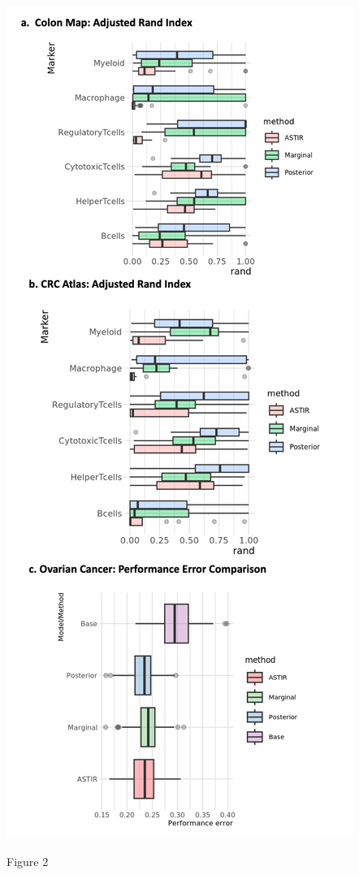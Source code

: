 \documentclass[
  letterpaper,
  DIV=11,
  numbers=noendperiod,
  oneside]{scrreprt}
\begin{document}
\begin{marginfigure}

{\centering \includegraphics{Figure2.png}

}

\caption{Figure 2}

\end{marginfigure}
\end{document}

